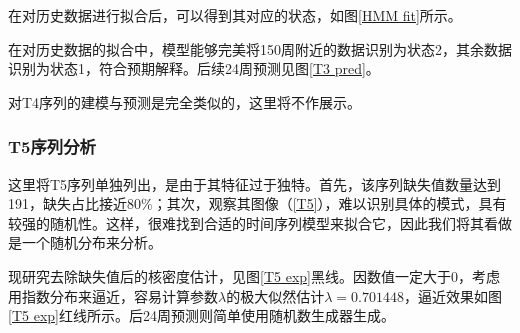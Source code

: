 \documentclass{my_paper}
\begin{document}
  在对历史数据进行拟合后，可以得到其对应的状态，如图\ref{HMM fit}所示。
  
   \begin{figure}[htbp]
	\centering

\end{figure}
  

   

  
   在对历史数据的拟合中，模型能够完美将150周附近的数据识别为状态2，其余数据识别为状态1，符合预期解释。后续24周预测见图\ref{T3 pred}。
   
   对T4序列的建模与预测是完全类似的，这里将不作展示。
  

  
  \subsubsection{T5序列分析}
 这里将T5序列单独列出，是由于其特征过于独特。首先，该序列缺失值数量达到191，缺失占比接近80\%；其次，观察其图像（\ref{T5}），难以识别具体的模式，具有较强的随机性。这样，很难找到合适的时间序列模型来拟合它，因此我们将其看做是一个随机分布来分析。
 \begin{figure}[htbp]
	\centering
	\centering
\end{figure}


  
  现研究去除缺失值后的核密度估计，见图\ref{T5 exp}黑线。因数值一定大于0，考虑用指数分布来逼近，容易计算参数$\lambda$的极大似然估计$\lambda = 0.701448$，逼近效果如图\ref{T5 exp}红线所示。后24周预测则简单使用随机数生成器生成。
  
\end{document}
